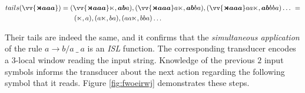 \begin{multline*}
tails(\vv{\bm{\bow aaa}}) = (\vv{\bm{\bow aaa}}\eow, \bm{ab}a), (\vv{\bm{\bow aaa}}a\eow, \bm{ab}ba), (\vv{\bm{\bow aaa}}aa\eow, \bm{ab}bba) \dots~ =  \\
 \qquad\qquad\qquad\qquad\quad \shoveleft{(\eow, a), (a\eow, ba), (aa\eow, bba) \dots}
\end{multline*}

Their tails are indeed the same, and it confirms that the \emph{simultaneous application} of the rule $a \rightarrow b / a~ \_~ a$ is an \emph{ISL} function.
The corresponding transducer encodes a $3$-local window reading the input string.
Knowledge of the previous $2$ input symbols informs the transducer about the next action regarding the following symbol that it reads.
Figure \ref{fig:fwoeirwj} demonstrates these steps.

